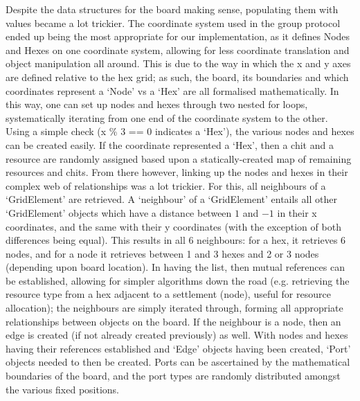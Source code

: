 \documentclass[a4paper,doc]{apa6}
\begin{document}
Despite the data structures for the board making sense, populating them with values became a lot trickier. The coordinate system used in the group protocol ended up being the most appropriate for our implementation, as it defines Nodes and Hexes on one coordinate system, allowing for less coordinate translation and object manipulation all around. This is due to the way in which the x and y axes are defined relative to the hex grid; as such, the board, its boundaries and which coordinates represent a ‘Node’ vs a ‘Hex’ are all formalised mathematically. In this way, one can set up nodes and hexes through two nested for loops, systematically iterating from one end of the coordinate system to the other. Using a simple check (x \% 3 == 0 indicates a ‘Hex’), the various nodes and hexes can be created easily. If the coordinate represented a ‘Hex’, then a chit and a resource are randomly assigned based upon a statically-created map of remaining resources and chits. From there however, linking up the nodes and hexes in their complex web of relationships was a lot trickier. For this, all neighbours of a ‘GridElement’ are retrieved. A ‘neighbour’ of a ‘GridElement’ entails all other ‘GridElement’ objects which have a distance between $1$ and $-1$ in their x coordinates, and the same with their y coordinates (with the exception of both differences being equal). This results in all 6 neighbours: for a hex, it retrieves 6 nodes, and for a node it retrieves between 1 and 3 hexes and 2 or 3 nodes (depending upon board location). In having the list, then mutual references can be established, allowing for simpler algorithms down the road (e.g. retrieving the resource type from a hex adjacent to a settlement (node), useful for resource allocation); the neighbours are simply iterated through, forming all appropriate relationships between objects on the board. If the neighbour is a node, then an edge is created (if not already created previously) as well. With nodes and hexes having their references established and ‘Edge’ objects having been created, ‘Port’ objects needed to then be created. Ports can be ascertained by the mathematical boundaries of the board, and the port types are randomly distributed amongst the various fixed positions. 
\end{document}
